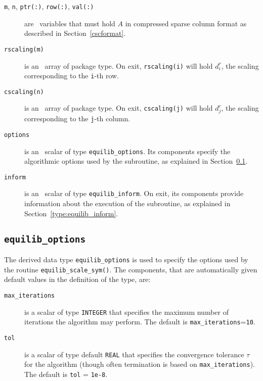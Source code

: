 \begin{description}

\item[\texttt{m}, \texttt{n}, \texttt{ptr(:)}, \texttt{row(:)}, \texttt{val(:)}] are \intentin\ variables that must hold $A$ in compressed sparse column format as described in Section~\ref{cscformat}.

\item[\texttt{rscaling(m)}] is an \intentout\ array of package type. On exit,
\texttt{rscaling(i)} will hold $d^r_i$, the scaling corresponding to the
\texttt{i}-th row.

\item[\texttt{cscaling(n)}] is an \intentout\ array of package type. On exit,
\texttt{cscaling(j)} will hold $d^c_j$, the scaling corresponding to the
\texttt{j}-th column.

\item[\texttt{options}] is an \intentin\ scalar of type \texttt{equilib\_options}. Its components specify the algorithmic options used by the subroutine, as explained in Section~\ref{type:equilib_options}.

\item[\texttt{inform}] is an \intentout\ scalar of type \texttt{equilib\_inform}. On exit, its components provide information about the execution of the subroutine, as explained in Section~\ref{type:equilib_inform}.

\end{description}

\subsection{\texttt{equilib\_options}} \label{type:equilib_options}

The derived data type \texttt{equilib\_options} is used to specify the options
used by the routine \texttt{equilib\_scale\_sym()}. The components, that are
automatically given default values in the definition of the type, are:

\begin{description}

\item[\texttt{max\_iterations}] is a scalar of type \texttt{INTEGER} that specifies the maximum number of iterations the algorithm may perform. The default is \texttt{max\_iterations}=\texttt{10}.

\item[\texttt{tol}] is a scalar of type default \texttt{REAL} that specifies the convergence tolerance $\tau$ for the algorithm (though often termination is based on \texttt{max\_iterations}). The default is \texttt{tol} = \texttt{1e-8}.

\end{description}

